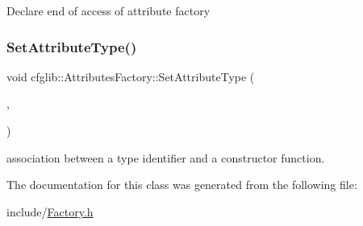 Declare end of access of attribute factory \mbox{\label{classcfglib_1_1AttributesFactory_a409fa8a154e72a1041438c6e278bd502}} 
\subsubsection{\texorpdfstring{Set\+Attribute\+Type()}{SetAttributeType()}}
{\footnotesize\ttfamily void cfglib\+::\+Attributes\+Factory\+::\+Set\+Attribute\+Type (\begin{DoxyParamCaption}\item[{std\+::string const \&}]{,  }\item[{\hyperlink{classcfglib_1_1SerialisableAttribute}{Serialisable\+Attribute} $\ast$}]{ }\end{DoxyParamCaption})}

association between a type identifier and a constructor function. 

The documentation for this class was generated from the following file\+:\begin{DoxyCompactItemize}
\item 
include/\hyperlink{Factory_8h}{Factory.\+h}\end{DoxyCompactItemize}
